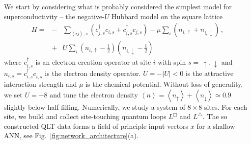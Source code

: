 \documentclass[amsmath,amssymb, aps, prx, longbibliography, twocolumn]{revtex4-1}
\begin{document}
We start by considering what is probably considered the simplest model for superconductivity -- the negative-$U$ Hubbard model on the square lattice \cite{Scalettar1989, Scalapino1992}
\begin{eqnarray}
H = &-&\underset{\left\langle ij \right\rangle, s}{\sum} \left( c^\dagger_{j,s}c_{i,s} +  c^\dagger_{i,s}c_{j,s} \right) -  \mu\underset{i}{\sum} \left(n_{i,\uparrow} +n_{i,\downarrow}\right) \,, \nonumber\\
&+& U \underset{i}{\sum} \left(n_{i,\uparrow}-\frac{1}{2}\right) \left(n_{i,\downarrow}-\frac{1}{2}\right)
\label{eq:hubbard}
\end{eqnarray}
where $c^\dagger_{i,s}$ is an electron creation operator at site $i$ with spin $s =\, \uparrow, \downarrow$  and $n_{i,s}=c^\dagger_{i,s}c^{\phantom\dagger}_{i,s}$ is the electron density operator. $U=-\left|U\right|<0$ is the attractive interaction strength and $\mu$ is the chemical potential.  Without loss of generality, we set $U=-8$ and tune the electron density $\left\langle n\right\rangle = \left\langle n_\uparrow\right\rangle+ \left\langle n_\downarrow\right\rangle  \simeq 0.9$ slightly below half filling. 
Numerically, we study a system of $8\times 8$ sites. For each site, we  build and collect site-touching quantum loops $L^\Box$ and $ L^\triangle$. The so constructed QLT data forms a field of principle input vectors $x$ for a shallow ANN, see Fig.~\ref{fig:network_architecture}(a). 
\end{document}
